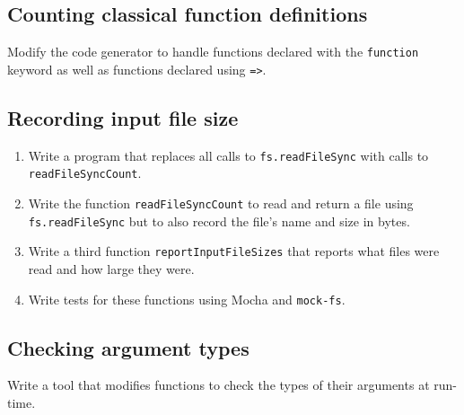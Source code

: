 \documentclass[krantzl]{krantz}
\begin{document}
\subsection*{Counting classical function definitions}


Modify the code generator to handle functions declared with the \texttt{function} keyword
as well as functions declared using \texttt{=>}.

\subsection*{Recording input file size}

\begin{enumerate}

\item 

Write a program that replaces all calls to \texttt{fs.readFileSync}
    with calls to \texttt{readFileSyncCount}.



\item 

Write the function \texttt{readFileSyncCount} to read and return a file using \texttt{fs.readFileSync}
    but to also record the file's name and size in bytes.



\item 

Write a third function \texttt{reportInputFileSizes} that reports
    what files were read and how large they were.



\item 

Write tests for these functions using Mocha and \texttt{mock-fs}.



\end{enumerate}

\subsection*{Checking argument types}


Write a tool that modifies functions to check the types of their arguments at run-time.
\end{document}
